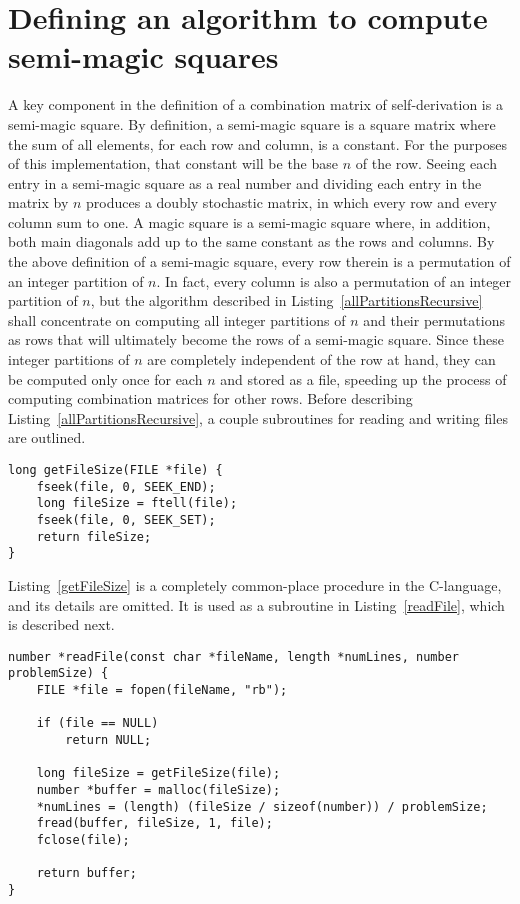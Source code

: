 \section{Defining an algorithm to compute semi-magic squares}

A key component in the definition of a combination matrix of self-derivation is a semi-magic square. By definition, a semi-magic square is a square matrix where the sum of all elements, for each row and column, is a constant. For the purposes of this implementation, that constant will be the base $n$ of the row. Seeing each entry in a semi-magic square as a real number and dividing each entry in the matrix by $n$ produces a doubly stochastic matrix, in which every row and every column sum to one. A magic square is a semi-magic square where, in addition, both main diagonals add up to the same constant as the rows and columns. By the above definition of a semi-magic square, every row therein is a permutation of an integer partition of $n$. In fact, every column is also a permutation of an integer partition of $n$, but the algorithm described in Listing~\ref{allPartitionsRecursive} shall concentrate on computing all integer partitions of $n$ and their permutations as rows that will ultimately become the rows of a semi-magic square. Since these integer partitions of $n$ are completely independent of the row at hand, they can be computed only once for each $n$ and stored as a file, speeding up the process of computing combination matrices for other rows. Before describing Listing~\ref{allPartitionsRecursive}, a couple subroutines for reading and writing files are outlined.

\begin{lstlisting}[caption={Retrieving the size of a file.},label={getFileSize}]
long getFileSize(FILE *file) {
    fseek(file, 0, SEEK_END);
    long fileSize = ftell(file);
    fseek(file, 0, SEEK_SET);
    return fileSize;
}
\end{lstlisting}

Listing~\ref{getFileSize} is a completely common-place procedure in the C-language, and its details are omitted. It is used as a subroutine in Listing~\ref{readFile}, which is described next.

\begin{lstlisting}[caption={Reading the contents of a file.},label={readFile}]
number *readFile(const char *fileName, length *numLines, number problemSize) {
    FILE *file = fopen(fileName, "rb");

    if (file == NULL)
        return NULL;

    long fileSize = getFileSize(file);
    number *buffer = malloc(fileSize);
    *numLines = (length) (fileSize / sizeof(number)) / problemSize;
    fread(buffer, fileSize, 1, file);
    fclose(file);

    return buffer;
}
\end{lstlisting}

